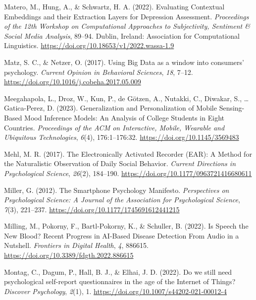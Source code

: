 \documentclass[
  english,
  man,floatsintext]{apa6}
\newlength{\cslhangindent}
\newenvironment{CSLReferences}[2] %
 {%
  \setlength{\parindent}{0pt}
  \ifodd #1 \everypar{\setlength{\hangindent}{\cslhangindent}}\ignorespaces\fi
  \ifnum #2 > 0
  \setlength{\parskip}{#2\baselineskip}
  \fi
 }%
 {}
\begin{document}
\begin{CSLReferences}{1}{0}
\leavevmode{}%
Matero, M., Hung, A., \& Schwartz, H. A. (2022). Evaluating {Contextual Embeddings} and their {Extraction Layers} for {Depression Assessment}. \emph{Proceedings of the 12th {Workshop} on {Computational Approaches} to {Subjectivity}, {Sentiment} \& {Social Media Analysis}}, 89--94. Dublin, Ireland: Association for Computational Linguistics. \url{https://doi.org/10.18653/v1/2022.wassa-1.9}

\leavevmode{}%
Matz, S. C., \& Netzer, O. (2017). Using {Big Data} as a window into consumers' psychology. \emph{Current Opinion in Behavioral Sciences}, \emph{18}, 7--12. \url{https://doi.org/10.1016/j.cobeha.2017.05.009}

\leavevmode{}%
Meegahapola, L., Droz, W., Kun, P., de Götzen, A., Nutakki, C., Diwakar, S., \ldots{} Gatica-Perez, D. (2023). Generalization and {Personalization} of {Mobile Sensing-Based Mood Inference Models}: {An Analysis} of {College Students} in {Eight Countries}. \emph{Proceedings of the ACM on Interactive, Mobile, Wearable and Ubiquitous Technologies}, \emph{6}(4), 176:1--176:32. \url{https://doi.org/10.1145/3569483}

\leavevmode{}%
Mehl, M. R. (2017). The {Electronically Activated Recorder} ({EAR}): {A Method} for the {Naturalistic Observation} of {Daily Social Behavior}. \emph{Current Directions in Psychological Science}, \emph{26}(2), 184--190. \url{https://doi.org/10.1177/0963721416680611}

\leavevmode{}%
Miller, G. (2012). The {Smartphone Psychology Manifesto}. \emph{Perspectives on Psychological Science: A Journal of the Association for Psychological Science}, \emph{7}(3), 221--237. \url{https://doi.org/10.1177/1745691612441215}

\leavevmode{}%
Milling, M., Pokorny, F., Bartl-Pokorny, K., \& Schuller, B. (2022). Is {Speech} the {New Blood}? {Recent Progress} in {AI-Based Disease Detection From Audio} in a {Nutshell}. \emph{Frontiers in Digital Health}, \emph{4}, 886615. \url{https://doi.org/10.3389/fdgth.2022.886615}

\leavevmode{}%
Montag, C., Dagum, P., Hall, B. J., \& Elhai, J. D. (2022). Do we still need psychological self-report questionnaires in the age of the {Internet} of {Things}? \emph{Discover Psychology}, \emph{2}(1), 1. \url{https://doi.org/10.1007/s44202-021-00012-4}


\end{CSLReferences}
\end{document}

